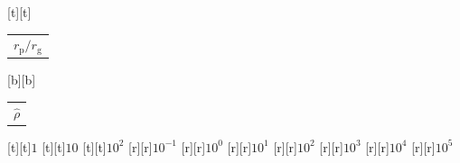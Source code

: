 %    
%
%
\begin{psfrags}%
\psfragscanon%
%
[t][t]{\color[rgb]{0,0,0}\setlength{\tabcolsep}{0pt}\begin{tabular}{c}{\Large$r_\mathrm{p}/r_\mathrm{g}$}\end{tabular}}%
[b][b]{\color[rgb]{0,0,0}\setlength{\tabcolsep}{0pt}\begin{tabular}{c}{\Large$\hat{\rho}$}\end{tabular}}%
%
[t][t]{$1$}%
[t][t]{$10$}%
[t][t]{$10^{2}$}%
%
[r][r]{$10^{-1}$}%
[r][r]{$10^{0}$}%
[r][r]{$10^{1}$}%
[r][r]{$10^{2}$}%
[r][r]{$10^{3}$}%
[r][r]{$10^{4}$}%
[r][r]{$10^{5}$}%
%
%
\end{psfrags}%
%
